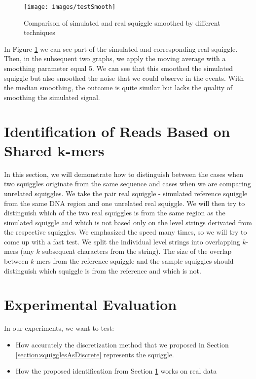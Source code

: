 \begin{figure}
\centerline{\texttt{[image: images/testSmooth]}}
\caption[Hehe]{Comparison of simulated and real squiggle smoothed by different techniques}
\label{obr:testSmooth}
\end{figure}

In Figure \ref{obr:testSmooth} we can see part of the simulated and corresponding real squiggle.
Then, in the subsequent two graphs, we apply the moving average with a smoothing parameter
equal 5. We can see that this smoothed the simulated squiggle but also smoothed the noise
that we could observe in the events. With the median smoothing, the outcome is quite
similar but lacks the quality of smoothing the simulated signal.

\section{Identification of Reads Based on Shared k-mers}
\label{section:readIdentification}

In this section, we will demonstrate how to distinguish between the cases when two squiggles
originate from the same sequence and cases when we are comparing unrelated squiggles.
We take the pair real squiggle - simulated reference squiggle from the same DNA region and one unrelated real squiggle.
We will then try to distinguish which of the two real squiggles is from the same region as the simulated squiggle
and which is not based only on the level strings derivated from the respective squiggles. We
emphasized the speed many times, so we will try to come up with a fast test.
We split the individual level strings into overlapping $k$-mers (any $k$ subsequent
characters from the string). The size of the overlap between $k$-mers from the reference
squiggle and the sample squiggles should distinguish which squiggle is from the reference and which is not.

\section{Experimental Evaluation}

In our experiments, we want to test:

\begin{itemize}
    \item How accurately the discretization method that we proposed in Section \ref{section:squigglesAsDiscrete} represents the squiggle.
    \item How the proposed identification from Section \ref{section:readIdentification} works on real data
\end{itemize}

